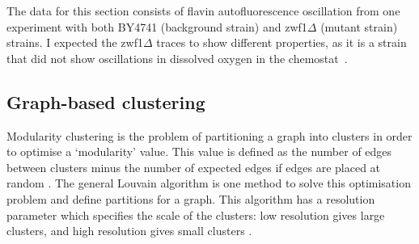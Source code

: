 The data for this section consists of flavin autofluorescence oscillation from one experiment with both BY4741 (background strain) and zwf1$\Delta$ (mutant strain) strains.
I expected the zwf1$\Delta$ traces to show different properties, as it is a strain that did not show oscillations in dissolved oxygen in the chemostat~\parencite{tuCyclicChangesMetabolic2007}.


\subsection{Graph-based clustering}
\label{subsec:analysis-clustering-graphclustering}


Modularity clustering is the problem of partitioning a graph into clusters in order to optimise a `modularity' value.
This value is defined as the number of edges between clusters minus the number of expected edges if edges are placed at random \parencite{newmanModularityCommunityStructure2006}.
The general Louvain algorithm \parencite{blondelFastUnfoldingCommunities2008,muchaCommunityStructureTimeDependent2010} is one method to solve this optimisation problem and define partitions for a graph.
This algorithm has a resolution parameter which specifies the scale of the clusters: low resolution gives large clusters, and high resolution gives small clusters \parencite{fortunatoResolutionLimitCommunity2007}.

